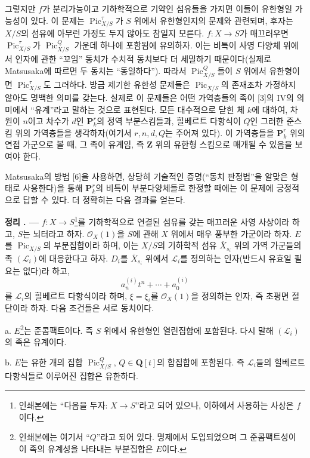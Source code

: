 \documentclass[11pt,twoside,openany]{book}
\numberwithin{equation}{section}
\newcommand{\sourceunit}{front}
\newcommand{\src}[1]{%
  \phantomsection\hypertarget{src:\sourceunit:#1}{}%
  \marginpar{\raggedleft\footnotesize\sffamily #1}%
}
\theoremstyle{plain}
\theoremstyle{definition}
\theoremstyle{remark}
\newcommand{\result}[2]{%
  \par\medskip\noindent\textbf{#1%
  \if\relax\detokenize{#2}\relax\else\space#2\fi. ---}\enspace
}
\begin{document}
\src{242}
그렇지만 $f$가 분리가능이고 기하학적으로 기약인 섬유들을 가지면 이들이
유한형일 가능성이 있다. 이 문제는 $\operatorname{Pic}_{X/S}^\tau$가 $S$
위에서 유한형인지의 문제와 관련되며, 후자는 $X/S$의 섬유에 아무런 가정도
두지 않아도 참일지 모른다. $f:X\longrightarrow S$가 매끄러우면
$\operatorname{Pic}_{X/S}^\tau$가 $\operatorname{Pic}_{X/S}^Q$ 가운데
하나에 포함됨에 유의하자. 이는 비특이 사영 다양체 위에서 인자에 관한
``꼬임'' 동치가 수치적 동치보다 더 세밀하기 때문이다(실제로 Matsusaka에
따르면 두 동치는 ``동일하다''). 따라서 $\operatorname{Pic}_{X/S}^Q$들이
$S$ 위에서 유한형이면 $\operatorname{Pic}_{X/S}^\tau$도 그러하다. 방금
제기한 유한성 문제들은 $\operatorname{Pic}_{X/S}$의 존재조차 가정하지
않아도 명백한 의미를 갖는다. 실제로 이 문제들은 어떤 가역층들의 족이
[3]의 IV의 의미에서 ``유계''라고 말하는 것으로 표현된다. 모든 대수적으로
닫힌 체 $k$에 대하여, 차원이 $n$이고 차수가 $d$인 $\mathbf P_k^r$의 정역
부분스킴들과, 힐베르트 다항식이 $Q$인 그러한 준스킴 위의 가역층들을
생각하자(여기서 $r,n,d,Q$는 주어져 있다). 이 가역층들을
$\mathbf P_k^r$ 위의 연접 가군으로 볼 때, 그 족이 유계임, 즉 $\mathbf Z$
위의 유한형 스킴으로 매개될 수 있음을 보여야 한다.

Matsusaka의 방법 [6]을 사용하면, 상당히 기술적인 증명(``동치 판정법''을
알맞은 형태로 사용한다)을 통해 $\mathbf P_k^r$의 비특이 부분다양체들로
한정할 때에는 이 문제에 긍정적으로 답할 수 있다. 더 정확히는 다음 결과를
얻는다.
\result{정리}{4.1} $f:X\longrightarrow S$\footnote{인쇄본에는
``다음을 두자: $X\longrightarrow S$''라고 되어 있으나, 이하에서 사용하는
사상은 $f$이다.}를 기하학적으로 연결된 섬유를 갖는 매끄러운 사영 사상이라
하고, $S$는 뇌터라고 하자. $\mathcal O_X(1)$을 $S$에 관해 $X$ 위에서 매우
풍부한 가군이라 하자. $E$를 $\operatorname{Pic}_{X/S}$의 부분집합이라 하며,
이는 $X/S$의 기하학적 섬유 $\overline X_{s_i}$ 위의 가역 가군들의 족
$(\mathcal L_i)$에 대응한다고 하자. $D_i$를 $\overline X_{s_i}$ 위에서
$\mathcal L_i$를 정의하는 인자(반드시 유효일 필요는 없다)라 하고,
\[
a_n^{(i)}t^n+\cdots+a_0^{(i)}
\]
를 $\mathcal L_i$의 힐베르트 다항식이라 하며, $\xi=\xi_i$를
$\mathcal O_X(1)$을 정의하는 인자, 즉 초평면 절단이라 하자. 다음 조건들은
서로 동치이다.

\noindent a. $E$\footnote{인쇄본에는 여기서 ``$Q$''라고 되어 있다. 명제에서
도입되었으며 그 준콤팩트성이 이 족의 유계성을 나타내는 부분집합은
$E$이다.}는 준콤팩트이다. 즉 $S$ 위에서 유한형인 열린집합에 포함된다.
다시 말해 $(\mathcal L_i)$의 족은 유계이다.

\noindent b. $E$는 유한 개의 집합 $\operatorname{Pic}_{X/S}^Q$,
$Q\in\mathbf Q[t]$의 합집합에 포함된다. 즉 $\mathcal L_i$들의 힐베르트
다항식들로 이루어진 집합은 유한하다.
\end{document}

